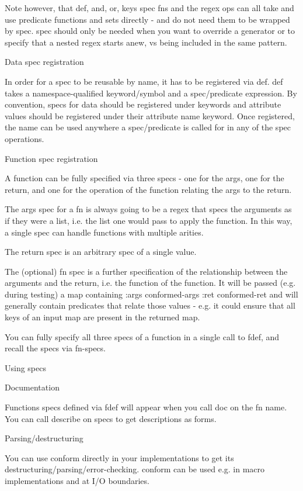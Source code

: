 Note however, that def, and, or, keys spec fns and the regex ops can all take and use predicate functions and sets directly - and do not need them to be wrapped by spec. spec should only be needed when you want to override a generator or to specify that a nested regex starts anew, vs being included in the same pattern.

Data spec registration

In order for a spec to be reusable by name, it has to be registered via def. def takes a namespace-qualified keyword/symbol and a spec/predicate expression. By convention, specs for data should be registered under keywords and attribute values should be registered under their attribute name keyword. Once registered, the name can be used anywhere a spec/predicate is called for in any of the spec operations.

Function spec registration

A function can be fully specified via three specs - one for the args, one for the return, and one for the operation of the function relating the args to the return.

The args spec for a fn is always going to be a regex that specs the arguments as if they were a list, i.e. the list one would pass to apply the function. In this way, a single spec can handle functions with multiple arities.

The return spec is an arbitrary spec of a single value.

The (optional) fn spec is a further specification of the relationship between the arguments and the return, i.e. the function of the function. It will be passed (e.g. during testing) a map containing {:args conformed-args :ret conformed-ret} and will generally contain predicates that relate those values - e.g. it could ensure that all keys of an input map are present in the returned map.

You can fully specify all three specs of a function in a single call to fdef, and recall the specs via fn-specs.

Using specs

Documentation

Functions specs defined via fdef will appear when you call doc on the fn name. You can call describe on specs to get descriptions as forms.

Parsing/destructuring

You can use conform directly in your implementations to get its destructuring/parsing/error-checking. conform can be used e.g. in macro implementations and at I/O boundaries.

